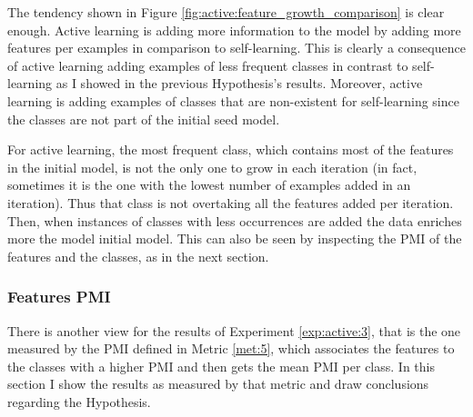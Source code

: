 The tendency shown in Figure \ref{fig:active:feature_growth_comparison} is
clear enough. Active learning is adding more information to the model by adding
more features per examples in comparison to self-learning. This is clearly a
consequence of active learning adding examples of less frequent classes in
contrast to self-learning as I showed in the previous Hypothesis's results.
Moreover, active learning is adding examples of classes that are non-existent
for self-learning since the classes are not part of the initial seed model.

For active learning, the most frequent class, which contains most of the
features in the initial model, is not the only one to grow in each iteration
(in fact, sometimes it is the one with the lowest number of examples added in
an iteration). Thus that class is not overtaking all the features added per
iteration. Then, when instances of classes with less occurrences are added the
data enriches more the model initial model. This can also be seen by inspecting
the PMI of the features and the classes, as in the next section.

\subsubsection{Features PMI}

There is another view for the results of Experiment \ref{exp:active:3}, that is
the one measured by the PMI defined in Metric \ref{met:5}, which associates the
features to the classes with a higher PMI and then gets the mean PMI per class.
In this section I show the results as measured by that metric and draw
conclusions regarding the Hypothesis.

